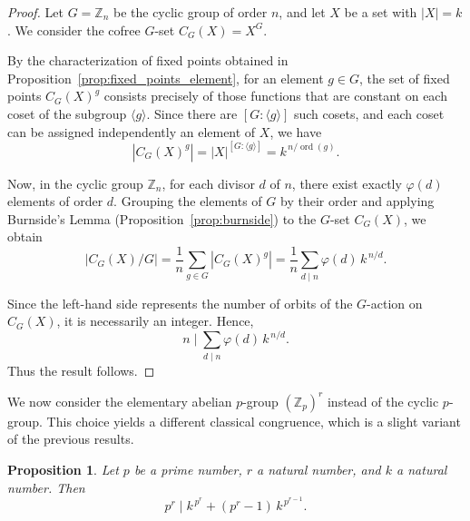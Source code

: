 \documentclass[10pt,a4paper]{amsart}
\newtheorem{proposition}{Proposition}
\begin{document}
\begin{proof}
Let $G = \mathbb{Z}_n$ be the cyclic group of order $n$, and let $X$ be a set with $|X| = k$. We consider the cofree $G$-set $C_G(X) = X^G$.

By the characterization of fixed points obtained in Proposition~\ref{prop:fixed_points_element}, for an element $g \in G$, the set of fixed points $C_G(X)^g$ consists precisely of those functions that are constant on each coset of the subgroup $\langle g \rangle$. Since there are $[G : \langle g \rangle]$ such cosets, and each coset can be assigned independently an element of $X$, we have
\[
\left\lvert C_G(X)^g \right\rvert = |X|^{[G : \langle g \rangle]} = k^{\, n / \operatorname{ord}(g)}.
\]

Now, in the cyclic group $\mathbb{Z}_n$, for each divisor $d$ of $n$, there exist exactly $\varphi(d)$ elements of order $d$. Grouping the elements of $G$ by their order and applying Burnside's Lemma (Proposition~\ref{prop:burnside}) to the $G$-set $C_G(X)$, we obtain
\[
\left\lvert C_G(X) / G \right\rvert
= \frac{1}{n} \sum_{g \in G} \left\lvert C_G(X)^g \right\rvert
= \frac{1}{n} \sum_{d \mid n} \varphi(d)\, k^{\, n/d}.
\]

Since the left-hand side represents the number of orbits of the $G$-action on $C_G(X)$, it is necessarily an integer. Hence,
\[
n \mid \sum_{d \mid n} \varphi(d)\, k^{\, n/d}.
\]
Thus the result follows.
\end{proof}

We now consider the elementary abelian $p$-group $(\mathbb{Z}_p)^r$ instead of the cyclic $p$-group. This choice yields a different classical congruence, which is a slight variant of the previous results.

\begin{proposition}\label{prop:fermat_elementary_abelian}
Let $p$ be a prime number, $r$ a natural number, and $k$ a natural number. Then
\[
p^r \mid k^{\,p^r} + (p^r - 1)\, k^{\,p^{r-1}}.
\]
\end{proposition}
\end{document}
